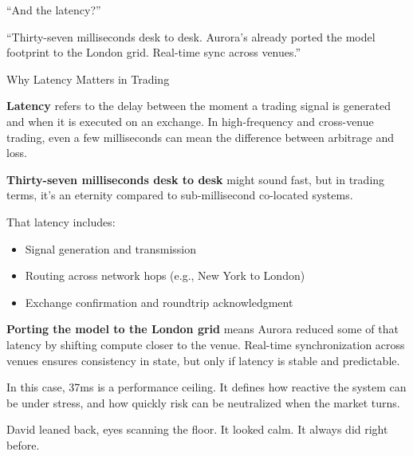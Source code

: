 “And the latency?”

“Thirty-seven milliseconds desk to desk. Aurora’s already ported the model footprint to the London grid. 
Real-time sync across venues.”

\medskip

\begin{TechnicalSidebar}{Why Latency Matters in Trading}

  \textbf{Latency} refers to the delay between the moment a trading signal is generated and when it 
  is executed on an exchange.  
  In high-frequency and cross-venue trading, even a few milliseconds can mean the difference 
  between arbitrage and loss.

  \medskip

  \textbf{Thirty-seven milliseconds desk to desk} might sound fast, but in trading terms, it’s an eternity 
  compared to sub-millisecond co-located systems.  

  \medskip

  That latency includes:

  \begin{itemize}
    \item Signal generation and transmission
    \item Routing across network hops (e.g., New York to London)
    \item Exchange confirmation and roundtrip acknowledgment
  \end{itemize}

  \medskip

  \textbf{Porting the model to the London grid} means Aurora reduced some of that latency by 
  shifting compute closer to the venue.  
  Real-time synchronization across venues ensures consistency in state, but only if latency 
  is stable and predictable.

  \medskip

  In this case, 37ms is a performance ceiling.  
  It defines how reactive the system can be under stress, and how quickly risk can be 
  neutralized when the market turns.

\end{TechnicalSidebar}

\medskip

David leaned back, eyes scanning the floor. It looked calm.
It always did right before.




